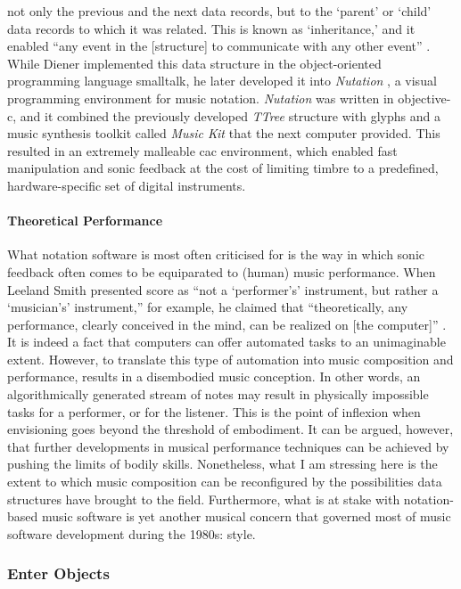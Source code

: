 not only the previous and the next data records, but to the `parent' or `child' data records to which it was related. This is known as `inheritance,' and it enabled ``any event in the [structure] to communicate with any other event'' \parencite[188]{icmc/bbp2372.1988.020}. While Diener implemented this data structure in the object-oriented programming language \gls{smalltalk}, he later developed it into \textit{Nutation} \parencite{DBLP:conf/icmc/Diener92}, a visual programming environment for music notation. \textit{Nutation} was written in \gls{objective-c}, and it combined the previously developed \textit{TTree} structure with glyphs and a music synthesis toolkit called \textit{Music Kit} that the \gls{next} computer provided. This resulted in an extremely malleable \gls{cac} environment, which enabled fast manipulation and sonic feedback at the cost of limiting timbre to a predefined, hardware-specific set of digital instruments. 

\paragraph{Theoretical Performance}
What notation software is most often criticised for is the way in which sonic feedback often comes to be equiparated to (human) music performance. When Leeland Smith presented \gls{score} as ``not a `performer's' instrument, but rather a `musician's' instrument,'' for example, he claimed that ``theoretically, any performance, clearly conceived in the mind, can be realized on [the computer]'' \parencite[14]{smith1971}. It is indeed a fact that computers can offer automated tasks to an unimaginable extent. However, to translate this type of automation into music composition and performance, results in a disembodied music conception. In other words, an algorithmically generated stream of notes may result in physically impossible tasks for a performer, or for the listener. This is the point of inflexion when envisioning goes beyond the threshold of embodiment. It can be argued, however, that further developments in musical performance techniques can be achieved by pushing the limits of bodily skills. Nonetheless, what I am stressing here is the extent to which music composition can be reconfigured by the possibilities data structures have brought to the field. Furthermore, what is at stake with notation-based music software is yet another musical concern that governed most of music software development during the 1980s: style.

\subsubsection{Enter Objects}

